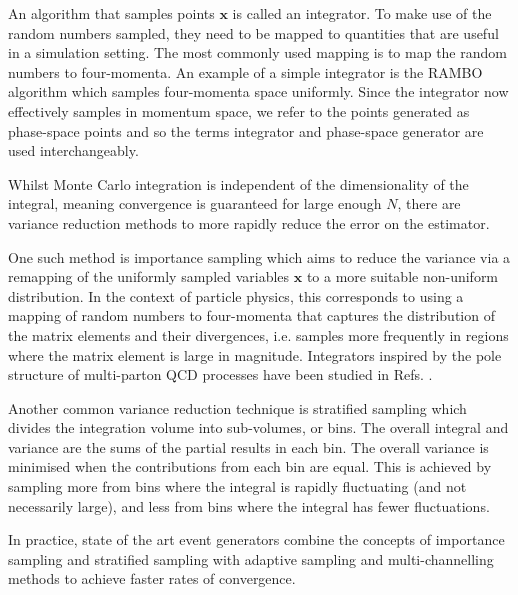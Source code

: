 \documentclass[main.tex]{subfiles}
\begin{document}
    An algorithm that samples points $\mathbf{x}$ is called
    an integrator. To make use of the random numbers sampled,
    they need to be mapped to quantities that are useful in a simulation
    setting. The most commonly used mapping is to map
    the random numbers to four-momenta. An example of a
    simple integrator is the RAMBO algorithm \cite{Kleiss:1985gy,Platzer:2013esa}
    which samples four-momenta space uniformly. Since the integrator
    now effectively samples in momentum space, we refer to the points
    generated as phase-space points and so the terms integrator
    and phase-space generator are used interchangeably.

    Whilst Monte Carlo integration is independent of the
    dimensionality of the integral, meaning convergence is
    guaranteed for large enough $N$, there are variance
    reduction methods to more rapidly reduce the error
    on the estimator.

    One such method is importance sampling which
    aims to reduce the variance via a remapping of the
    uniformly sampled variables $\mathbf{x}$
    to a more suitable non-uniform distribution.
    In the context of particle physics,
    this corresponds to using a mapping of random numbers
    to four-momenta that captures the distribution of the
    matrix elements and their divergences, i.e. samples
    more frequently in regions where the matrix element
    is large in magnitude. Integrators inspired by the pole
    structure of multi-parton QCD processes have been
    studied in Refs. \cite{Draggiotis:2000gm,vanHameren:2002tc}.
    
    Another common variance reduction technique is
    stratified sampling which divides the integration
    volume into sub-volumes, or bins. The overall integral
    and variance are the sums of the partial results
    in each bin. The overall variance is minimised when
    the contributions from each bin are equal. This
    is achieved by sampling more from bins where the integral
    is rapidly fluctuating (and not necessarily large),
    and less from bins where the integral has fewer fluctuations.
    
    In practice, state of the art event generators
    combine the concepts of importance sampling and stratified
    sampling with adaptive sampling \cite{Lepage:1977sw,Lepage:2020tgj}
    and multi-channelling methods \cite{Kleiss:1994qy,Ohl:1998jn}
    to achieve faster rates of convergence.
\end{document}
